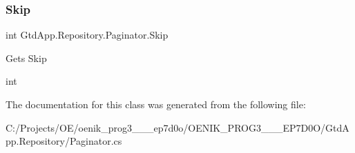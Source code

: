 \subsubsection{\texorpdfstring{Skip}{Skip}}
{\footnotesize\ttfamily int Gtd\+App.\+Repository.\+Paginator.\+Skip\hspace{0.3cm}{\ttfamily [get]}}



Gets Skip 

int

The documentation for this class was generated from the following file\+:\begin{DoxyCompactItemize}
\item 
C\+:/\+Projects/\+O\+E/oenik\+\_\+prog3\+\_\+\_\+\_\+ep7d0o/\+O\+E\+N\+I\+K\+\_\+\+P\+R\+O\+G3\+\_\+\_\+\_\+\+E\+P7\+D0\+O/\+Gtd\+App.\+Repository/Paginator.\+cs\end{DoxyCompactItemize}
